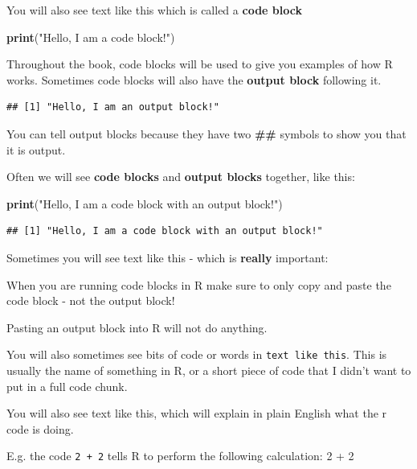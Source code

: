 \documentclass[
]{book}
\newenvironment{Shaded}{\begin{snugshade}}{\end{snugshade}}
\newcommand{\KeywordTok}[1]{\textcolor[rgb]{0.13,0.29,0.53}{\textbf{#1}}}
\newcommand{\NormalTok}[1]{#1}
\newcommand{\StringTok}[1]{\textcolor[rgb]{0.31,0.60,0.02}{#1}}
\begin{document}
You will also see text like this which is called a \textbf{code block}

\begin{Shaded}
\begin{Highlighting}[]
\KeywordTok{print}\NormalTok{(}\StringTok{"Hello, I am a code block!"}\NormalTok{)}
\end{Highlighting}
\end{Shaded}

Throughout the book, code blocks will be used to give you examples of how R works. Sometimes code blocks will also have the \textbf{output block} following it.

\begin{verbatim}
## [1] "Hello, I am an output block!"
\end{verbatim}

You can tell output blocks because they have two \textbf{\#\#} symbols to show you that it is output.

Often we will see \textbf{code blocks} and \textbf{output blocks} together, like this:

\begin{Shaded}
\begin{Highlighting}[]
\KeywordTok{print}\NormalTok{(}\StringTok{"Hello, I am a code block with an output block!"}\NormalTok{)}
\end{Highlighting}
\end{Shaded}

\begin{verbatim}
## [1] "Hello, I am a code block with an output block!"
\end{verbatim}

Sometimes you will see text like this - which is \textbf{really} important:

\begin{hey}
When you are running code blocks in R make sure to only copy and paste
the code block - not the output block!
\end{hey}

Pasting an output block into R will not do anything.

You will also sometimes see bits of code or words in \texttt{text\ like\ this}. This is usually the name of something in R, or a short piece of code that I didn't want to put in a full code chunk.

\begin{translate}
You will also see text like this, which will explain in plain English
what the r code is doing.

E.g. the code \texttt{2\ +\ 2} tells R to perform the following
calculation: 2 + 2
\end{translate}
\end{document}
